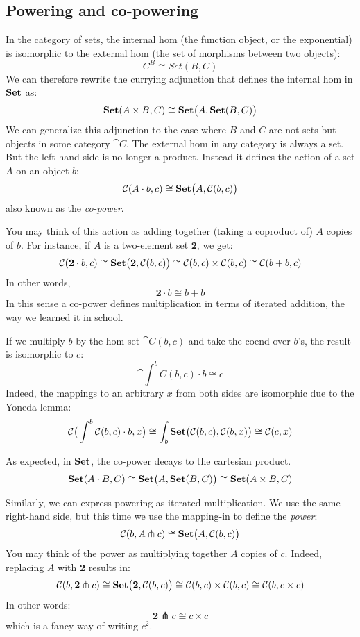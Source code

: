 \documentclass[DaoFP]{subfiles}
\begin{document}
\subsection{Powering and co-powering}

In the category of sets, the internal hom (the function object, or the exponential) is isomorphic to the external hom (the set of morphisms between two objects):
\[ C^B \cong Set(B, C) \]
We can therefore rewrite the currying adjunction that defines the internal hom in $\mathbf{Set}$ as:
\[ \mathbf{Set} (A \times B, C)  \cong \mathbf{Set} \big(A, \mathbf{Set} (B, C)\big) \]
We can generalize this adjunction to the case where $B$ and $C$ are not sets but objects in some category $\cat C$. The external hom in any category is always a set. But the left-hand side is no longer a product. Instead it defines the action of a set $A$ on an object $b$:
\[ \mathcal{C} (A \cdot b, c) \cong \mathbf{Set} \big( A, \mathcal{C} (b, c)\big) \]
also known as the \emph{co-power}.

You may think of this action as adding together (taking a coproduct of) $A$ copies of $b$. For instance, if $A$ is a two-element set $\mathbf 2$, we get:
\[ \mathcal{C} (\mathbf 2 \cdot b, c) \cong \mathbf{Set} \big( \mathbf 2, \mathcal{C} (b, c)\big) \cong \mathcal{C}(b, c) \times \mathcal{C}(b, c) \cong \mathcal{C}(b + b, c) \]
In other words, 
\[ \mathbf 2 \cdot b \cong b + b \]
In this sense a co-power defines multiplication in terms of iterated addition, the way we learned it in school. 

If we multiply $b$ by the hom-set $\cat C (b, c)$ and take the coend over $b$'s, the result is isomorphic to $c$:
\[ \cat \int^b C(b, c) \cdot b \cong c \]
Indeed, the mappings to an arbitrary $x$ from both sides are isomorphic due to the Yoneda lemma:
\[ \mathcal{C} \big( \int^b \mathcal{C}(b, c) \cdot b, x\big) \cong \int_b \mathbf{Set} \big( \mathcal{C}(b, c), \mathcal{C} (b, x)\big) \cong \mathcal{C} (c, x)\]



As expected, in $\mathbf{Set}$, the co-power decays to the cartesian product.
\[ \mathbf{Set} (A \cdot B, C) \cong \mathbf{Set} \big( A, \mathbf{Set}(B, C)\big) \cong \mathbf{Set} (A \times B, C) \]

Similarly, we can express powering as iterated multiplication. We use the same right-hand side, but this time we use the mapping-in to define the \emph{power}:
\[ \mathcal{C} (b, A \pitchfork c) \cong \mathbf{Set}  \big(A, \mathcal{C}(b, c)\big) \]
You may think of the power as multiplying together $A$ copies of $c$. Indeed, replacing $A$ with $\mathbf 2$ results in:
\[ \mathcal{C} (b, \mathbf 2 \pitchfork c) \cong \mathbf{Set}  \big(\mathbf 2, \mathcal{C}(b, c)\big) \cong \mathcal{C}(b, c) \times \mathcal{C}(b, c) \cong \mathcal{C} (b, c \times c)\]
In other words:
\[ \mathbf 2 \pitchfork c \cong c \times c \]
which is a fancy way of writing $c^2$.
\end{document}
